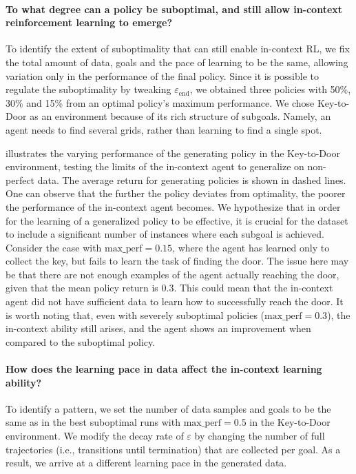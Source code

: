 \documentclass{article}
\theoremstyle{plain}
\theoremstyle{definition}
\theoremstyle{remark}
\begin{document}
\paragraph{To what degree can a policy be suboptimal, and still allow in-context reinforcement learning to emerge?}
To identify the extent of suboptimality that can still enable in-context RL, we fix the total amount of data, goals and the pace of learning to be the same, allowing variation only in the performance of the final policy. Since it is possible to regulate the suboptimality by tweaking $\varepsilon_\textrm{end}$, we obtained three policies with 50\%, 30\% and 15\% from an optimal policy's maximum performance. We chose Key-to-Door as an environment because of its rich structure of subgoals. Namely, an agent needs to find several grids, rather than learning to find a single spot.

 illustrates the varying performance of the generating policy in the Key-to-Door environment, testing the limits of the in-context agent to generalize on non-perfect data. The average return for generating policies is shown in dashed lines. One can observe that the further the policy deviates from optimality, the poorer the performance of the in-context agent becomes. We hypothesize that in order for the learning of a generalized policy to be effective, it is crucial for the dataset to include a significant number of instances where each subgoal is achieved. Consider the case with $\textrm{max\_perf} = 0.15$, where the agent has learned only to collect the key, but fails to learn the task of finding the door. The issue here may be that there are not enough examples of the agent actually reaching the door, given that the mean policy return is 0.3. This could mean that the in-context agent did not have sufficient data to learn how to successfully reach the door. It is worth noting that, even with severely suboptimal policies ($\textrm{max\_perf} = 0.3$), the in-context ability still arises, and the agent shows an improvement when compared to the suboptimal policy.

\paragraph{How does the learning pace in data affect the in-context learning ability?} 
To identify a pattern, we set the number of data samples and goals to be the same as in the best suboptimal runs with $\textrm{max\_perf} = 0.5$ in the Key-to-Door environment. We modify the decay rate of $\varepsilon$ by changing the number of full trajectories (i.e., transitions until termination) that are collected per goal. As a result, we arrive at a different learning pace in the generated data.
\end{document}
